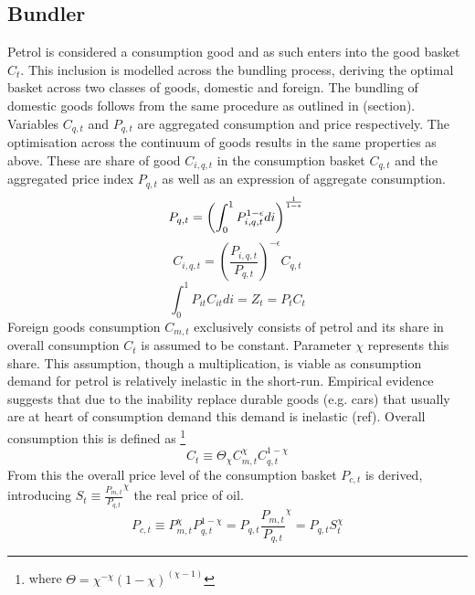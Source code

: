 \documentclass[12pt,a4paper,english]{article} %
\begin{document}
	\subsection{Bundler}
	Petrol is considered a consumption good and as such enters into the good basket $C_t$. This inclusion is modelled across the bundling process, deriving the optimal basket across two classes of goods, domestic and foreign. 
	The bundling of domestic goods follows from the same procedure as outlined in (section). Variables $C_{q,t}$ and $P_{q,t}$ are aggregated consumption and price respectively. The optimisation across the continuum of goods results in the same properties as above. These are share of good $C_{i,q,t}$ in the consumption basket $C_{q,t}$ and the aggregated price index $P_{q,t}$ as well as an expression of aggregate consumption. \\
	\begin{equation} \label{eq:o_pindex}
		P_{q,t} = \left( \int_{0}^{1} P_{i,q,t}^{1 - \epsilon} di \right)^{\frac{1}{1-\epsilon}} \\
	\end{equation}
	\begin{equation} \label{eq:o_cshare}
		C_{i,q,t} = \left( \frac{P_{i,q,t}}{P_{q,t}} \right)^{-\epsilon} C_{q,t}
	\end{equation}
	\begin{equation} \label{eq:o_pcon}
		\int_{0}^{1} P_{it} C_{it} di = Z_t = P_t C_t
	\end{equation}
	Foreign goods consumption $C_{m,t}$ exclusively consists of petrol and its share in overall consumption $C_t$ is assumed to be constant. Parameter $\chi$ represents this share. 
	This assumption, though a multiplication, is viable as consumption demand for petrol is relatively inelastic in the short-run. Empirical evidence suggests that due to the inability replace durable goods (e.g. cars) that usually are at heart of consumption demand this demand is inelastic (ref). Overall consumption this is defined as \footnote{where $\Theta = \chi^{-\chi}(1-\chi)^{(\chi-1)}$}
	\begin{equation}
		C_t \equiv \Theta_\chi C_{m,t}^\chi C_{q,t}^{1-\chi}
	\end{equation}
	From this the overall price level of the consumption basket $P_{c,t}$ is derived, introducing $S_t \equiv \frac{P_{m,t}}{P_{q,t}}^\chi$ the real price of oil.
	\begin{equation}
		P_{c,t} \equiv P_{m,t}^\chi P_{q,t}^{1-\chi} 
			= P_{q,t} \frac{P_{m,t}}{P_{q,t}}^\chi
			= P_{q,t} S_t^\chi
	\end{equation}
		
\end{document}
